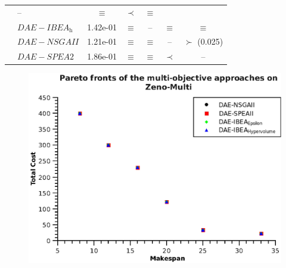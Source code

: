 \documentclass[a4paper,10pt]{report} %
\begin{document}
\begin{landscape}
\begin{table}[ht!]
\begin{center}
\begin{tabular}{|l|l|c|c|c|c|c|}
      &    --  		& 		$\equiv$       &  	$\prec$  	&  	$\equiv$	   \\
	      & $DAE-IBEA_{\textit{h}}$ 	    &       1.42e-01

		 & $\equiv$      	& 	--       & 	$\equiv$ 	&	$\equiv$      \\
	      &  $DAE-NSGAII$	    &   1.21e-01
  &$\equiv$  & 	$\equiv$ 	&	--		&   $\succ $ (0.025) \\
	      &  $DAE-SPEA2$	  &    1.86e-01

    &$\equiv$ 	&	$\equiv$ 	& 	$\prec$  	 &  --  \\
   \hline
\end{tabular} 

\end{center}
\end{table}
\end{landscape}

\newpage
\begin{figure}[ht]
\begin{center}
 \includegraphics[bb=0 -0.250000 370.750 278.250]{./pareto_zeno_add.eps}
\end{center}
\end{figure}
\end{document}
